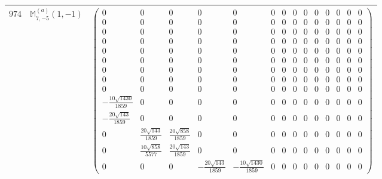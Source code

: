 \documentclass[fleqn,8pt,landscape]{jsarticle}
\begin{document}
\begin{center}
\begin{longtable}{ccc}
$ 974 $ & $ \mathbb{M}_{7,-5}^{(a)}(1,-1) $ & $ \begin{pmatrix} 0 & 0 & 0 & 0 & 0 & 0 & 0 & 0 & 0 & 0 & 0 & 0 & 0 & 0 \\ 0 & 0 & 0 & 0 & 0 & 0 & 0 & 0 & 0 & 0 & 0 & 0 & 0 & 0 \\ 0 & 0 & 0 & 0 & 0 & 0 & 0 & 0 & 0 & 0 & 0 & 0 & 0 & 0 \\ 0 & 0 & 0 & 0 & 0 & 0 & 0 & 0 & 0 & 0 & 0 & 0 & 0 & 0 \\ 0 & 0 & 0 & 0 & 0 & 0 & 0 & 0 & 0 & 0 & 0 & 0 & 0 & 0 \\ 0 & 0 & 0 & 0 & 0 & 0 & 0 & 0 & 0 & 0 & 0 & 0 & 0 & 0 \\ 0 & 0 & 0 & 0 & 0 & 0 & 0 & 0 & 0 & 0 & 0 & 0 & 0 & 0 \\ 0 & 0 & 0 & 0 & 0 & 0 & 0 & 0 & 0 & 0 & 0 & 0 & 0 & 0 \\ 0 & 0 & 0 & 0 & 0 & 0 & 0 & 0 & 0 & 0 & 0 & 0 & 0 & 0 \\ - \frac{10 \sqrt{1430}}{1859} & 0 & 0 & 0 & 0 & 0 & 0 & 0 & 0 & 0 & 0 & 0 & 0 & 0 \\ - \frac{20 \sqrt{143}}{1859} & 0 & 0 & 0 & 0 & 0 & 0 & 0 & 0 & 0 & 0 & 0 & 0 & 0 \\ 0 & \frac{20 \sqrt{143}}{1859} & \frac{20 \sqrt{858}}{1859} & 0 & 0 & 0 & 0 & 0 & 0 & 0 & 0 & 0 & 0 & 0 \\ 0 & \frac{10 \sqrt{858}}{5577} & \frac{20 \sqrt{143}}{1859} & 0 & 0 & 0 & 0 & 0 & 0 & 0 & 0 & 0 & 0 & 0 \\ 0 & 0 & 0 & - \frac{20 \sqrt{143}}{1859} & - \frac{10 \sqrt{1430}}{1859} & 0 & 0 & 0 & 0 & 0 & 0 & 0 & 0 & 0 \end{pmatrix} $ \\ \hline

\end{longtable}
\end{center}
\end{document}
